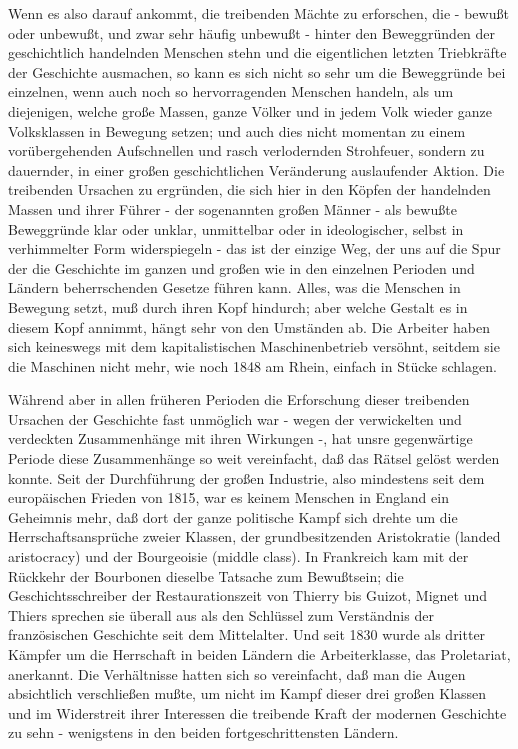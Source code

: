 Wenn es also darauf ankommt, die treibenden Mächte zu
erforschen, die - bewußt oder unbewußt, und zwar sehr häufig unbewußt -
hinter den Beweggründen der geschichtlich handelnden Menschen stehn und
die eigentlichen letzten Triebkräfte der Geschichte ausmachen, so kann
es sich nicht so sehr um die Beweggründe bei einzelnen, wenn auch noch
so hervorragenden Menschen handeln, als um diejenigen, welche große
Massen, ganze Völker und in jedem Volk wieder ganze Volksklassen in
Bewegung setzen; und auch dies nicht momentan zu einem vorübergehenden
Aufschnellen und rasch verlodernden Strohfeuer, sondern zu dauernder, in
einer großen geschichtlichen Veränderung auslaufender Aktion. Die
treibenden Ursachen zu ergründen, die sich hier in den Köpfen der
handelnden Massen und ihrer Führer - der sogenannten großen Männer - als
bewußte Beweggründe klar oder unklar, unmittelbar oder in ideologischer,
selbst in verhimmelter Form widerspiegeln - das ist der einzige Weg, der
uns auf die Spur der die Geschichte im ganzen und großen wie in den
einzelnen Perioden und Ländern beherrschenden Gesetze führen kann.
Alles, was die Menschen in Bewegung setzt, muß durch ihren Kopf
hindurch; aber welche Gestalt es in diesem Kopf annimmt, hängt sehr von
den Umständen ab. Die Arbeiter haben sich keineswegs mit dem
kapitalistischen Maschinenbetrieb versöhnt, seitdem sie die Maschinen
nicht mehr, wie noch 1848 am Rhein, einfach in Stücke schlagen.

Während aber in allen früheren Perioden die Erforschung dieser
treibenden Ursachen der
Geschichte fast unmöglich war - wegen der verwickelten und verdeckten
Zusammenhänge mit ihren Wirkungen -, hat unsre gegenwärtige Periode
diese Zusammenhänge so weit vereinfacht, daß das Rätsel gelöst werden
konnte. Seit der Durchführung der großen Industrie, also mindestens seit
dem europäischen Frieden von 1815, war es keinem Menschen in England ein
Geheimnis mehr, daß dort der ganze politische Kampf sich drehte um die
Herrschaftsansprüche zweier Klassen, der grundbesitzenden Aristokratie
(landed aristocracy) und der Bourgeoisie (middle class). In Frankreich
kam mit der Rückkehr der Bourbonen dieselbe Tatsache zum Bewußtsein; die
Geschichtsschreiber der Restaurationszeit von Thierry bis Guizot, Mignet
und Thiers sprechen sie überall aus als den Schlüssel zum Verständnis
der französischen Geschichte seit dem Mittelalter. Und seit 1830 wurde
als dritter Kämpfer um die Herrschaft in beiden Ländern die
Arbeiterklasse, das Proletariat, anerkannt. Die Verhältnisse hatten sich
so vereinfacht, daß man die Augen absichtlich verschließen mußte, um
nicht im Kampf dieser drei großen Klassen und im Widerstreit ihrer
Interessen die treibende Kraft der modernen Geschichte zu sehn -
wenigstens in den beiden fortgeschrittensten Ländern.

